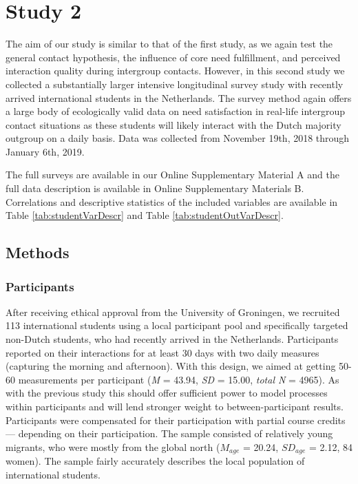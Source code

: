 \section{Study 2}

The aim of our study is similar to that of the first study, as we again
test the general contact hypothesis, the influence of core need
fulfillment, and perceived interaction quality during intergroup
contacts. However, in this second study we collected a substantially
larger intensive longitudinal survey study with recently arrived
international students in the Netherlands. The survey method again
offers a large body of ecologically valid data on need satisfaction in
real-life intergroup contact situations as these students will likely
interact with the Dutch majority outgroup on a daily basis. Data was
collected from November 19th, 2018 through January 6th, 2019.

The full surveys are available in our Online Supplementary Material A
and the full data description is available in Online Supplementary
Materials B. Correlations and descriptive statistics of the included
variables are available in Table \ref{tab:studentVarDescr} and Table
\ref{tab:studentOutVarDescr}.

\subsection{Methods}

\subsubsection{Participants}

After receiving ethical approval from the University of Groningen, we
recruited 113 international students using a local participant pool and
specifically targeted non-Dutch students, who had recently arrived in
the Netherlands. Participants reported on their interactions for at
least 30 days with two daily measures (capturing the morning and
afternoon). With this design, we aimed at getting 50-60 measurements per
participant (\textit{M} = 43.94, \textit{SD} = 15.00, \textit{total N} =
4965). As with the previous study this should offer sufficient power to
model processes within participants and will lend stronger weight to
between-participant results. Participants were compensated for their
participation with partial course credits --- depending on their
participation. The sample consisted of relatively young migrants, who
were mostly from the global north (\(M_{age}\) = 20.24, \(SD_{age}\) =
2.12, 84 women). The sample fairly accurately describes the local
population of international students.

